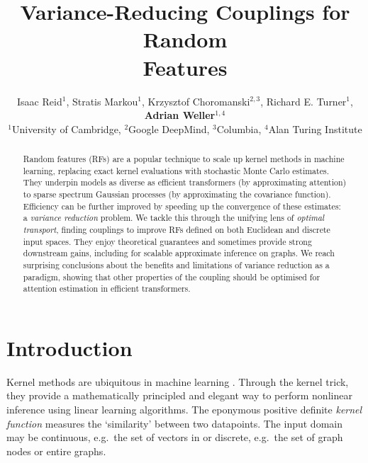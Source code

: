 \documentclass{article}
\title{Variance-Reducing Couplings for Random \\Features}
\author{Isaac Reid$^1$, Stratis Markou$^1$, Krzysztof Choromanski$^{2,3}$, Richard E. Turner$^1$, \\ \textbf{Adrian Weller}$^{1,4}$ 
\\ $^1$University of Cambridge, $^2$Google DeepMind, $^3$Columbia, $^4$Alan Turing Institute}
\begin{document}
\iclrfinalcopy 
\maketitle
{}

\begin{abstract}
Random features (RFs) are a popular technique to scale up kernel methods in machine learning, replacing exact kernel evaluations with stochastic Monte Carlo estimates.
They underpin models as diverse as efficient transformers (by approximating attention) to sparse spectrum Gaussian processes (by approximating the covariance function). 
Efficiency can be further improved by speeding up the convergence of these estimates: a \emph{variance reduction} problem. 
We tackle this through the unifying lens of \emph{optimal transport}, finding couplings to improve RFs defined on both Euclidean and discrete input spaces.  
They enjoy theoretical guarantees and sometimes provide strong downstream gains, including for scalable approximate inference on graphs.
We reach surprising conclusions about the benefits and limitations of variance reduction as a paradigm, showing that other properties of the coupling should be optimised for attention estimation in efficient transformers.
\end{abstract}

\vspace{-3mm}
\section{Introduction} \vspace{-1mm}
Kernel methods are ubiquitous in machine learning \citep{kernel-3,kernel-4,kernel-5,kernel-6}.
Through the kernel trick, they provide a mathematically principled and elegant way to perform nonlinear inference using linear learning algorithms. 
The eponymous positive definite \emph{kernel function}  measures the `similarity' between two datapoints. 
The input domain  may be continuous, e.g.~the set of vectors in  or discrete, e.g.~the set of graph nodes or entire graphs.
\end{document}
